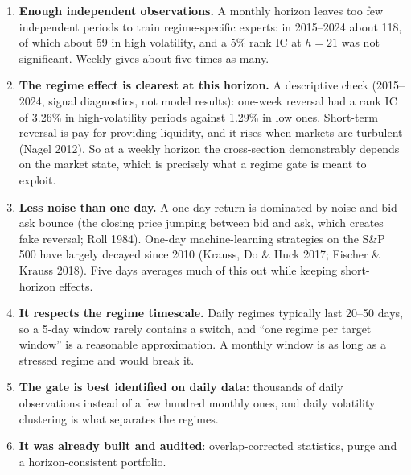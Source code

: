 \begin{whybox}
\begin{enumerate}
\item \textbf{Enough independent observations.} A monthly horizon leaves too few independent periods to train
  regime-specific experts: in 2015--2024 about 118, of which about 59 in high volatility, and a 5\% rank IC
  at $h=21$ was not significant. Weekly gives about five times as many.
\item \textbf{The regime effect is clearest at this horizon.} A descriptive check (2015--2024, signal
  diagnostics, not model results): one-week reversal had a rank IC of 3.26\% in high-volatility periods
  against 1.29\% in low ones. Short-term reversal is pay for providing liquidity, and it rises when markets
  are turbulent (Nagel 2012). So at a weekly horizon the cross-section demonstrably depends on the market
  state, which is precisely what a regime gate is meant to exploit.
\item \textbf{Less noise than one day.} A one-day return is dominated by noise and bid--ask bounce (the
  closing price jumping between bid and ask, which creates fake reversal; Roll 1984). One-day
  machine-learning strategies on the S\&P 500 have largely decayed since 2010 (Krauss, Do \& Huck 2017;
  Fischer \& Krauss 2018). Five days averages much of this out while keeping short-horizon effects.
\item \textbf{It respects the regime timescale.} Daily regimes typically last 20--50 days, so a 5-day window
  rarely contains a switch, and ``one regime per target window'' is a reasonable approximation. A monthly
  window is as long as a stressed regime and would break it.
\item \textbf{The gate is best identified on daily data}: thousands of daily observations instead of a few
  hundred monthly ones, and daily volatility clustering is what separates the regimes.
\item \textbf{It was already built and audited}: overlap-corrected statistics, purge and a horizon-consistent
  portfolio.
\end{enumerate}
\end{whybox}

